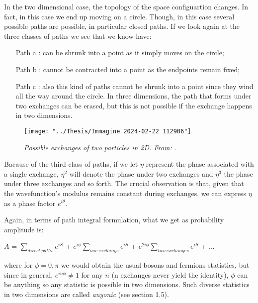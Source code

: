 \documentclass{Configuration_Files/PoliMi3i_thesis}
\begin{document}
In the two dimensional case, the topology of the space configuartion changes. In fact, in this case we end up moving on a circle.\newline
Though, in this case several possible paths are possible, in particular closed paths.
If we look again at the three classes of paths we see that we know have:

\begin{enumerate}
	\item[Path a] : can be shrunk into a point as it simply moves on the circle;

	\item[Path b] : cannot be contracted into a point as the endpoints remain fixed;

	\item[Path c] : also this kind of paths cannot be shrunk into a point since they wind all  the way around the circle. In three dimensions, the path that forms under two exchanges can be erased, but this is not possible if the exchange happens in two dimensions.
\end{enumerate}

\begin{figure}[H]
	\centering
	\texttt{[image: "../Thesis/Immagine 2024-02-22 112906"]}
	\caption{ \textit{ Possible exchanges of two particles in 2D. From: \cite{Rao16}.}}
	\label{fig:immagine-2024-02-22-112906}
\end{figure}

Bacause of the third class of paths, if we let $\eta$ represent the phase associated with a single exchange, $\eta^2$ will denote the phase under two exchanges and $\eta^3$ the phase under three exchanges and so forth. The crucial observation is that, given that the wavefunction's modulus remains constant during exchanges, we can express $\eta$ as a phase factor $e^{i\theta}$. \newline

Again, in terms of path integral formulation, what we get as probability amplitude is:

\begin{center}
	$A$ = $\sum_{direct \ paths} e^{iS}$ + $e^{i \phi} \sum_{ one \ exchange} e^{iS}$  + $e^{2i \phi} \sum_{ two \ exchanges} e^{iS}$  + ...
\end{center}

where for $ \phi = 0, \pi$ we would obtain the usual bosons and fermions statistics, but since in general, $e^{in\phi} \neq 1$ for any $n$ (n exchanges never yield the identity), $\phi$ can be anything so any statistic is possible in two dimensions.
Such diverse statistics in two dimensions are called \textit{anyonic} (see section 1.5).\newline
\end{document}
